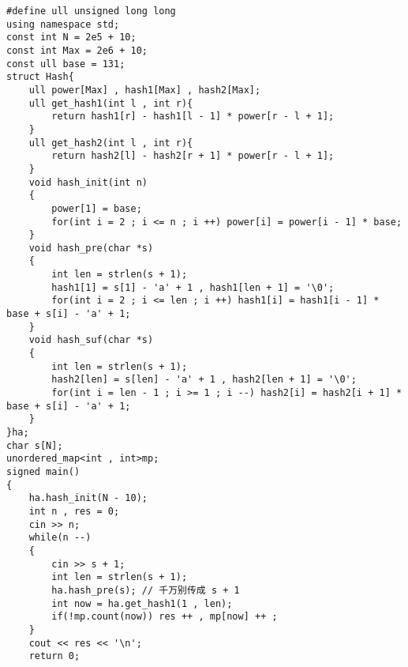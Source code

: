 \documentclass[E:/GsjzTle/main/main.tex]{subfiles}
\begin{document}
\begin{lstlisting}
#define ull unsigned long long
using namespace std;
const int N = 2e5 + 10;
const int Max = 2e6 + 10;
const ull base = 131;
struct Hash{
	ull power[Max] , hash1[Max] , hash2[Max];
	ull get_hash1(int l , int r){
		return hash1[r] - hash1[l - 1] * power[r - l + 1];
	}
	ull get_hash2(int l , int r){
		return hash2[l] - hash2[r + 1] * power[r - l + 1];
	}
	void hash_init(int n)
	{
		power[1] = base;
		for(int i = 2 ; i <= n ; i ++) power[i] = power[i - 1] * base;
	}
	void hash_pre(char *s)
	{
		int len = strlen(s + 1);
		hash1[1] = s[1] - 'a' + 1 , hash1[len + 1] = '\0';
		for(int i = 2 ; i <= len ; i ++) hash1[i] = hash1[i - 1] * base + s[i] - 'a' + 1;
	}
	void hash_suf(char *s) 
	{
		int len = strlen(s + 1);
		hash2[len] = s[len] - 'a' + 1 , hash2[len + 1] = '\0';
		for(int i = len - 1 ; i >= 1 ; i --) hash2[i] = hash2[i + 1] * base + s[i] - 'a' + 1;
	}
}ha;
char s[N];
unordered_map<int , int>mp;
signed main()
{
	ha.hash_init(N - 10);
	int n , res = 0;
	cin >> n;
	while(n --)
	{
		cin >> s + 1;
		int len = strlen(s + 1);
		ha.hash_pre(s); // 千万别传成 s + 1
		int now = ha.get_hash1(1 , len);
		if(!mp.count(now)) res ++ , mp[now] ++ ; 
	}
	cout << res << '\n';
	return 0;
\end{lstlisting}
\end{document}
